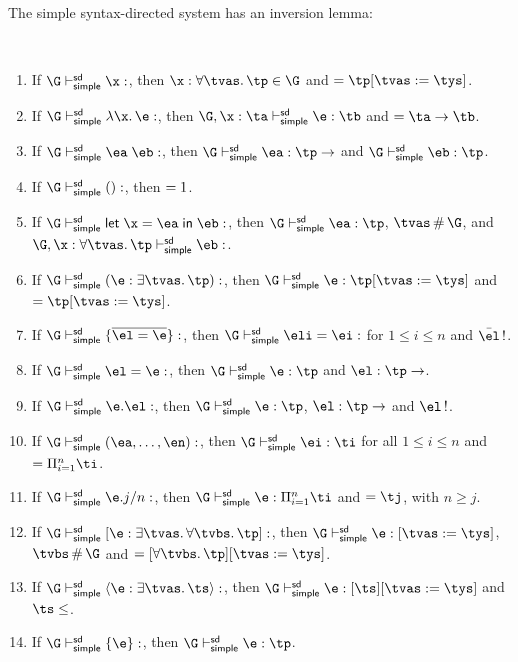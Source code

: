 \documentclass[acmsmall,screen,nonacm,review]{acmart}
\begin{document}
The simple syntax-directed system has an inversion lemma:
\begin{lemma}
  \label{lem:simple-inversion-sd}
  ~
  \begin{enumerate}[(\roman*)]
    \item If $\G \thsimplesd \x : \t$, then $\x : \tfor \tvs \tp \in \G$ and $\t = \tp\where{\tvs \is \tys}$.
    \item If $\G \thsimplesd \efun \x \e : \t$, then $\G, \x : \ta \thsimplesd \e : \tb$ and $\t = \ta \to \tb$.
    \item If $\G \thsimplesd \eapp \ea \eb : \t$, then $\G \thsimplesd \ea : \tp \to \t$ and $\G \thsimplesd \eb : \tp$.
    \item If $\G \thsimplesd \eunit : \t$, then $\relax = 1$.
    \item If $\G \thsimplesd \elet \x \ea \eb : \t$, then $\G \thsimplesd \ea : \tp$, $\tvs \disjoint \G$, and $\G, \x : \tfor \tvs \tp \thsimplesd \eb : \t$.
    \item If $\G \thsimplesd \eannot \e \tvs \tp : \t$, then $\G \thsimplesd \e : \tp\where{\tvs \is \tys}$ and $\t = \tp\where{\tvs \is \tys}$.
    \item If $\G \thsimplesd \erecord {\overline{\el = \e}} : \t$, then $\G \thsimplesd \eli = \ei : \t$ for $1 \leq i \leq n$ and $\bar\el \uni \t$.
    \item If $\G \thsimplesd \el = \e : \t$, then $\G \thsimplesd \e : \tp$ and $\el : \tp \to \t$.
    \item If $\G \thsimplesd \efield \e \el : \t$, then $\G \thsimplesd \e : \tp$, $\el : \tp \to \t$ and $\el \uni \t$.
    \item If $\G \thsimplesd \etuple {\ea, \ldots, \en} : \t$, then $\G \thsimplesd \ei : \ti$ for all $1 \leq i \leq n$ and $\t = \tProd \ti$.
    \item If $\G \thsimplesd \exproj \e j n : \t$, then $\G \thsimplesd \e : \tProd \ti$ and $\t = \tj$, with $n \geq j$.
    \item If $\G \thsimplesd \expoly \e \tvs {\tfor \tvbs \tp} : \t$, then $\G \thsimplesd \e : \t\where{\tvs \is \tys}$, $\tvbs \disjoint \G$ and
      $\t = \tpoly {\tfor \tvbs \tp}\where{\tvs \is \tys}$.
    \item If $\G \thsimplesd \exinst \e \tvs \ts : \t$, then $\G \thsimplesd \e : \tpoly \ts\where{\tvs \is \tys}$ and $\ts \leq \t$.
    \item If $\G \thsimplesd \emagic \e : \t$, then $\G \thsimplesd \e : \tp$.
  \end{enumerate}
\end{lemma}
\end{document}
